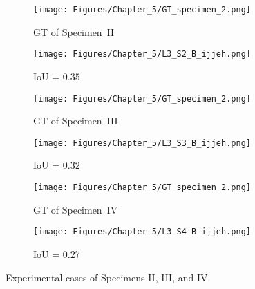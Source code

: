 \begin{figure} [!h]
	\centering
	\begin{subfigure}[b]{0.47\textwidth}
		\centering
		\texttt{[image: Figures/Chapter\_5/GT\_specimen\_2.png]}
		\caption{GT of Specimen~II}
		\label{fig:GT_specimen_2}
	\end{subfigure}
	\hfill
	\begin{subfigure}[b]{0.47\textwidth}
		\centering
		\texttt{[image: Figures/Chapter\_5/L3\_S2\_B\_ijjeh.png]}
		\caption{IoU = \(0.35\)} 
		\label{fig:L3_S2_B_ijjeh}
	\end{subfigure}
	\par\medskip
	\begin{subfigure}[b]{0.47\textwidth}
		\centering
		\texttt{[image: Figures/Chapter\_5/GT\_specimen\_2.png]}
		\caption{GT of Specimen~III}
		\label{fig:GT_specimen_3}
	\end{subfigure}
	\hfill
	\begin{subfigure}[b]{0.47\textwidth}
		\centering
		\texttt{[image: Figures/Chapter\_5/L3\_S3\_B\_ijjeh.png]}
		\caption{IoU = \(0.32\)} 
		\label{fig:L3_S3_B_ijjeh}
	\end{subfigure}
	\par\medskip
	\begin{subfigure}[b]{0.47\textwidth}
		\centering
		\texttt{[image: Figures/Chapter\_5/GT\_specimen\_2.png]}
		\caption{GT of Specimen~IV}
		\label{fig:gt_specimen_4}
	\end{subfigure}
	\hfill
	\begin{subfigure}[b]{0.47\textwidth}
		\centering
		\texttt{[image: Figures/Chapter\_5/L3\_S4\_B\_ijjeh.png]}
		\caption{IoU = \(0.27\)} 
		\label{fig:L3_S4_B_ijjeh}
	\end{subfigure}
	\caption{Experimental cases of Specimens II, III, and IV.}
	\label{fig:exp_case}
\end{figure} 

